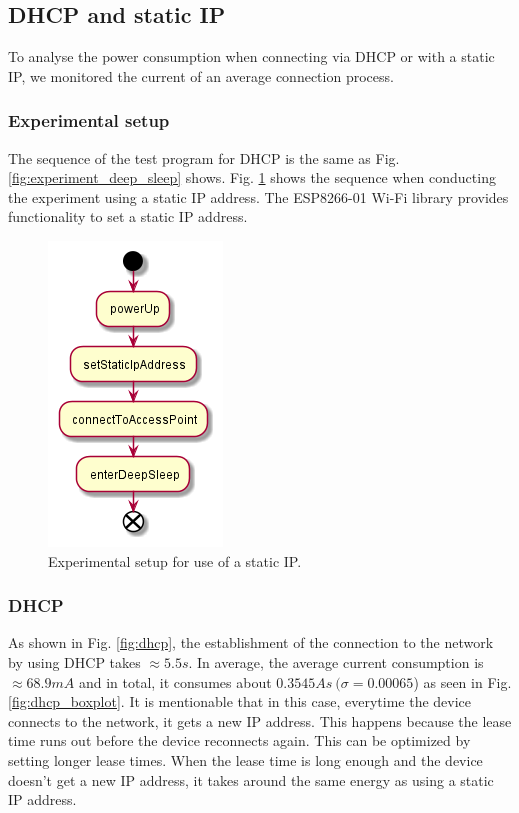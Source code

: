 \subsection{DHCP and static IP}
To analyse the power consumption when connecting via DHCP or with a static IP, we monitored the current of an average connection process.\\

\subsubsection{Experimental setup}
The sequence of the test program for DHCP is the same as Fig. \ref{fig:experiment_deep_sleep} shows.
Fig. \ref{fig:experiment_static_ip} shows the sequence when conducting the experiment using a static IP address.
The ESP8266-01 Wi-Fi library provides functionality to set a static IP address.
\begin{figure}[H]
    \centering
    \includegraphics[width = 0.35 \linewidth]{fig/sequence_static_ip.png}
    \caption{Experimental setup for use of a static IP.}
    \label{fig:experiment_static_ip}
\end{figure}

\subsubsection{DHCP}
As shown in Fig. \ref{fig:dhcp}, the establishment of the connection to the network by using DHCP takes $\approx 5.5 s$.
In average, the average current consumption is $\approx 68.9 mA$ and in total, it consumes about $0.3545 As\ (\sigma = 0.00065$) as seen in Fig. \ref{fig:dhcp_boxplot}.
It is mentionable that in this case, everytime the device connects to the network, it gets a new IP address.
This happens because the lease time runs out before the device reconnects again.
This can be optimized by setting longer lease times.
When the lease time is long enough and the device doesn't get a new IP address, it takes around the same energy as using a static IP address.\\

